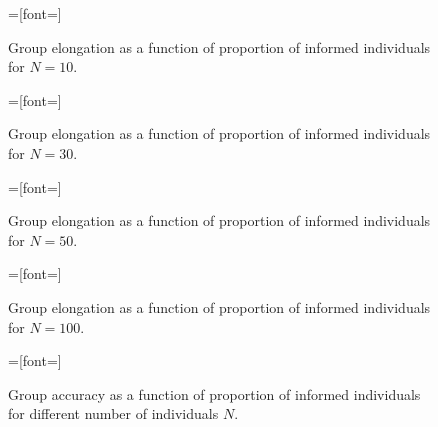 
\setlength{}
\setlength{}

\begin{figure}[H]
{}=[font=\scriptsize]

\caption{Group elongation as a function of proportion of informed individuals for $N=10$.}
\label{fig:elong10}
\end{figure}

\begin{figure}[H]
{}=[font=\scriptsize]

\caption{Group elongation as a function of proportion of informed individuals for $N=30$.}
\label{fig:elong30}
\end{figure}

\begin{figure}[H]
{}=[font=\scriptsize]

\caption{Group elongation as a function of proportion of informed individuals for $N=50$.}
\label{fig:elong50}
\end{figure}

\begin{figure}[H]
{}=[font=\scriptsize]

\caption{Group elongation as a function of proportion of informed individuals for $N=100$.}
\label{fig:elong100}
\end{figure}
\vfill

\begin{figure}[H]
{}=[font=\scriptsize]

\caption{Group accuracy as a function of proportion of informed individuals for different number of individuals $N$.}
\label{fig:accuracy}
\end{figure}